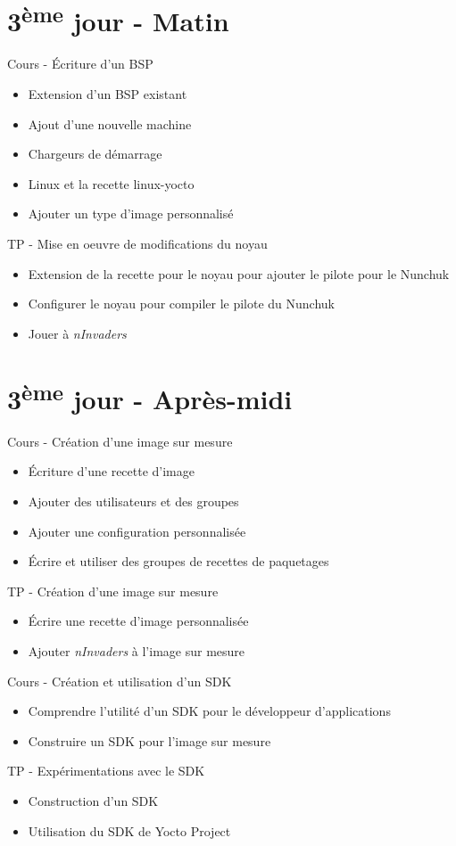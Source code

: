 \documentclass[a4paper,12pt,obeyspaces,spaces,hyphens]{article}
\begin{document}
\section{3\textsuperscript{ème} jour - Matin}

\feagendatwocolumn
{Cours - Écriture d'un BSP}
{
  \begin{itemize}
  \item Extension d'un BSP existant
  \item Ajout d'une nouvelle machine
  \item Chargeurs de démarrage
  \item Linux et la recette linux-yocto
  \item Ajouter un type d'image personnalisé
  \end{itemize}
}
{TP - Mise en oeuvre de modifications du noyau}
{
  \begin{itemize}
  \item Extension de la recette pour le noyau pour ajouter le pilote
        pour le Nunchuk
  \item Configurer le noyau pour compiler le pilote du Nunchuk
  \item Jouer à {\em nInvaders}
  \end{itemize}
}

\section{3\textsuperscript{ème} jour - Après-midi}

\feagendatwocolumn
{Cours - Création d'une image sur mesure}
{
  \begin{itemize}
  \item Écriture d'une recette d'image
  \item Ajouter des utilisateurs et des groupes
  \item Ajouter une configuration personnalisée
  \item Écrire et utiliser des groupes de recettes de paquetages
  \end{itemize}
}
{TP - Création d'une image sur mesure}
{
  \begin{itemize}
  \item Écrire une recette d'image personnalisée
  \item Ajouter {\em nInvaders} à l'image sur mesure
  \end{itemize}
}
\feagendatwocolumn
{Cours - Création et utilisation d'un SDK}
{
  \begin{itemize}
  \item Comprendre l'utilité d'un SDK pour le développeur d'applications
  \item Construire un SDK pour l'image sur mesure
  \end{itemize}
}
{TP - Expérimentations avec le SDK}
{
  \begin{itemize}
  \item Construction d'un SDK
  \item Utilisation du SDK de Yocto Project
  \end{itemize}
}
\end{document}
